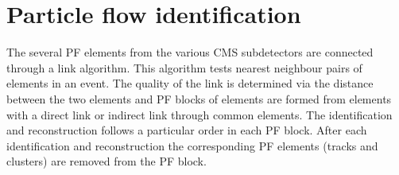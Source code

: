 

\section{Particle flow identification}
\label{sec:PF}
The several PF elements from the various CMS subdetectors are connected through a link algorithm. This algorithm tests nearest neighbour pairs of elements in an event. The quality of the link is determined via the distance between the two elements and PF blocks of elements are formed from elements with a direct link or indirect link through common elements. The identification and reconstruction follows a particular order in each PF block. After each identification and reconstruction the corresponding PF elements (tracks and clusters) are removed from the PF block.


